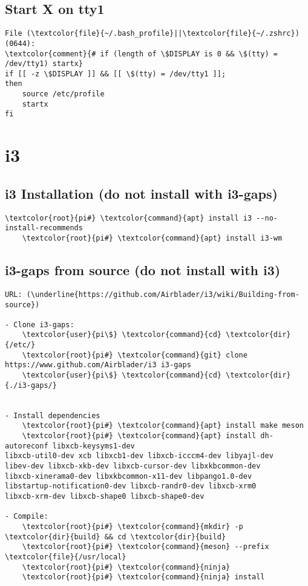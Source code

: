 \documentclass[10pt, a4paper, onecolumn, openany]{book} %
\begin{document}
\subsection{Start X on tty1}
\begin{Verbatim}[commandchars=\\\{\}]
File (\textcolor{file}{~/.bash_profile}||\textcolor{file}{~/.zshrc}) (0644):
\textcolor{comment}{# if (length of \$DISPLAY is 0 && \$(tty) = /dev/tty1) startx}
if [[ -z \$DISPLAY ]] && [[ \$(tty) = /dev/tty1 ]]; 
then
    source /etc/profile
    startx
fi
\end{Verbatim}


\section{i3}
\subsection{i3 Installation (do not install with i3-gaps)}
\begin{Verbatim}[commandchars=\\\{\}]
    \textcolor{root}{pi#} \textcolor{command}{apt} install i3 --no-install-recommends
    \textcolor{root}{pi#} \textcolor{command}{apt} install i3-wm 
\end{Verbatim}
\subsection{i3-gaps from source (do not install with i3)}
\begin{Verbatim}[commandchars=\\\{\}]
URL: (\underline{https://github.com/Airblader/i3/wiki/Building-from-source})

- Clone i3-gaps:
    \textcolor{user}{pi\$} \textcolor{command}{cd} \textcolor{dir}{/etc/}
    \textcolor{root}{pi#} \textcolor{command}{git} clone https://www.github.com/Airblader/i3 i3-gaps
    \textcolor{user}{pi\$} \textcolor{command}{cd} \textcolor{dir}{./i3-gaps/}


- Install dependencies
    \textcolor{root}{pi#} \textcolor{command}{apt} install make meson
    \textcolor{root}{pi#} \textcolor{command}{apt} install dh-autoreconf libxcb-keysyms1-dev 
libxcb-util0-dev xcb libxcb1-dev libxcb-icccm4-dev libyajl-dev
libev-dev libxcb-xkb-dev libxcb-cursor-dev libxkbcommon-dev 
libxcb-xinerama0-dev libxkbcommon-x11-dev libpango1.0-dev
libstartup-notification0-dev libxcb-randr0-dev libxcb-xrm0 
libxcb-xrm-dev libxcb-shape0 libxcb-shape0-dev

- Compile:
    \textcolor{root}{pi#} \textcolor{command}{mkdir} -p \textcolor{dir}{build} && cd \textcolor{dir}{build}
    \textcolor{root}{pi#} \textcolor{command}{meson} --prefix \textcolor{file}{/usr/local}
    \textcolor{root}{pi#} \textcolor{command}{ninja}
    \textcolor{root}{pi#} \textcolor{command}{ninja} install
\end{Verbatim}
\end{document}
